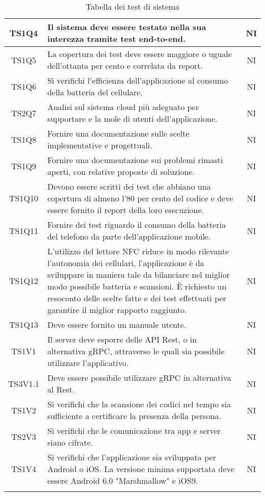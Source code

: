 \begin{center}
\begin{longtable}{|c|p{10cm}|c|}
			\hline
			TS1Q4 & Il sistema deve essere testato nella sua interezza tramite test end-to-end. & NI \\	
			\hline
			TS1Q5 & La copertura dei test deve essere maggiore o uguale dell'ottanta per cento e correlata da report. & NI \\	
			\hline
			TS1Q6 & Si verifichi l'efficienza dell'applicazione al consumo della batteria del cellulare. & NI \\	
			\hline
			TS2Q7 & Analisi sul sistema cloud più adeguato per supportare e la mole di utenti dell'applicazione. & NI \\	
			\hline
			TS1Q8 & Fornire una documentazione sulle scelte implementative e progettuali. & NI \\	
			\hline
			TS1Q9 & Fornire una documentazione sui problemi rimasti aperti, con relative proposte di soluzione. & NI \\	
			\hline
			TS1Q10 & Devono essere scritti dei test che abbiano una copertura di almeno l'80 per cento del codice e deve essere fornito il report della loro esecuzione. & NI \\	
			\hline
			TS1Q11 & Fornire dei test riguardo il consumo della batteria del telefono da parte dell'applicazione mobile. & NI \\	
			\hline
			TS1Q12 & L’utilizzo del lettore NFC riduce in modo rilevante l’autonomia dei cellulari, l’applicazione è da sviluppare in maniera tale da bilanciare nel miglior modo possibile batteria e scansioni. È richiesto un resoconto delle scelte fatte e dei test effettuati per garantire il miglior rapporto raggiunto. & NI \\	
			\hline
			TS1Q13 & Deve essere fornito un manuale utente. & NI \\	
			\hline
			TS1V1 & Il server deve esporre delle API Rest, o in alternativa gRPC, attraverso le quali sia possibile utilizzare l'applicativo. & NI \\	
			\hline
			TS3V1.1 & Deve essere possibile utilizzare gRPC in alternativa al Rest. & NI \\	
			\hline
			TS1V2 & Si verifichi che la scansione dei codici nel tempo sia sufficiente a certificare la presenza della persona. & NI \\	
			\hline
			TS2V3 & Si verifichi che le comunicazione tra app e server siano cifrate. & NI \\	
			\hline
			TS1V4 & Si verifichi che l'applicazione sia sviluppata per Android o iOS. La versione minima supportata deve essere  Android 6.0 "Marshmallow" e iOS9. & NI \\	
			\hline
			\hiderowcolors
			\caption{Tabella dei test di sistema}		
		\end{longtable}	
	\end{center}

